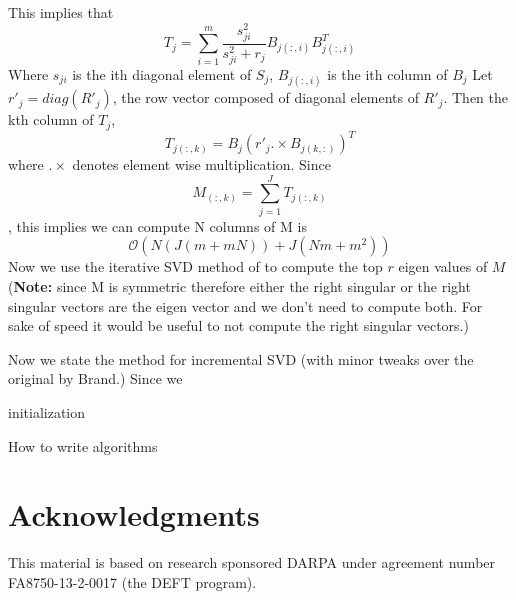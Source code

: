\documentclass[11pt]{article}
\begin{document}
This implies that
$$T_j = \sum_{i=1}^m \frac{s_{ji}^2}{s_{ji}^2+r_j} B_{j(:,i)}B_{j(:,i)}^T$$
Where $s_{ji}$ is the ith diagonal element of $S_j$, $B_{j(:,i)}$ is the
ith column of $B_{j}$
Let $r'_j = diag(R'_j)$, the row vector composed of diagonal elements
of $R'_j$. Then the kth column of $T_j$,
$$T_{j (:,k)} = B_j (r'_j .\times B_{j(k,:)})^T$$
where $.\times$ denotes element wise multiplication.
Since $$M_{(:,k)} = \sum_{j=1}^J T_{j (:,k)}$$, this implies we can
compute N columns of M is $$\mathcal{O}(N(J(m+mN)) + J(Nm + m^2))$$
Now we use the iterative SVD method of \cite{brand2002incremental} to
compute the top $r$ eigen values of $M$ (\textbf{Note:} since M is
symmetric therefore either the right singular or the right
singular vectors are the eigen vector and we don't need to compute
both. For sake of speed it would be useful to not compute the right
singular vectors.)

Now we state the method for incremental SVD (with minor tweaks over the
original by Brand.)
Since we 

\begin{algorithm}[H]
 \KwResult{}
 initialization\;
 \caption{How to write algorithms}
\end{algorithm}


\section*{Acknowledgments}
This material is based on research sponsored DARPA under agreement
number FA8750-13-2-0017 (the DEFT program).



\end{document}
